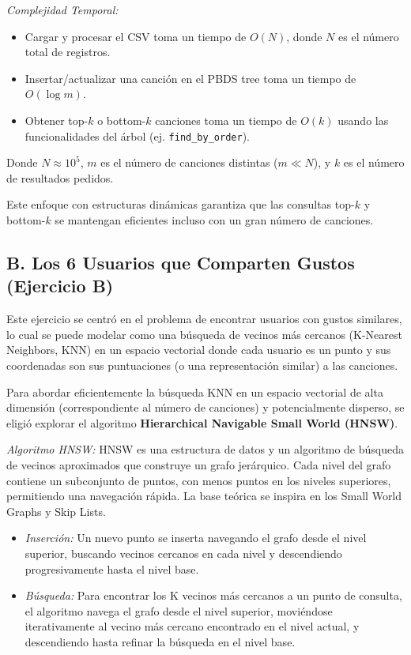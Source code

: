 \documentclass{article}
\begin{document}
\vspace{0.5em}
\noindent \textit{Complejidad Temporal:}
\begin{itemize}[label=\textbullet]
    \item Cargar y procesar el CSV toma un tiempo de \(O(N)\), donde \(N\) es el número total de registros.
    \item Insertar/actualizar una canción en el PBDS tree toma un tiempo de \(O(\log m)\).
    \item Obtener top-\(k\) o bottom-\(k\) canciones toma un tiempo de \(O(k)\) usando las funcionalidades del árbol (ej. \texttt{find\_by\_order}).
\end{itemize}
Donde \(N \approx 10^5\), \(m\) es el número de canciones distintas (\(m \ll N\)), y \(k\) es el número de resultados pedidos.

Este enfoque con estructuras dinámicas garantiza que las consultas top-\(k\) y bottom-\(k\) se mantengan eficientes incluso con un gran número de canciones.

\subsection{B. Los 6 Usuarios que Comparten Gustos (Ejercicio B)}

Este ejercicio se centró en el problema de encontrar usuarios con gustos similares, lo cual se puede modelar como una búsqueda de vecinos más cercanos (K-Nearest Neighbors, KNN) en un espacio vectorial donde cada usuario es un punto y sus coordenadas son sus puntuaciones (o una representación similar) a las canciones.

Para abordar eficientemente la búsqueda KNN en un espacio vectorial de alta dimensión (correspondiente al número de canciones) y potencialmente disperso, se eligió explorar el algoritmo \textbf{Hierarchical Navigable Small World (HNSW)}.

\vspace{0.5em}
\noindent \textit{Algoritmo HNSW:} HNSW es una estructura de datos y un algoritmo de búsqueda de vecinos aproximados que construye un grafo jerárquico. Cada nivel del grafo contiene un subconjunto de puntos, con menos puntos en los niveles superiores, permitiendo una navegación rápida. La base teórica se inspira en los Small World Graphs y Skip Lists.
\begin{itemize}[label=\textbullet]
    \item \textit{Inserción:} Un nuevo punto se inserta navegando el grafo desde el nivel superior, buscando vecinos cercanos en cada nivel y descendiendo progresivamente hasta el nivel base.
    \item \textit{Búsqueda:} Para encontrar los K vecinos más cercanos a un punto de consulta, el algoritmo navega el grafo desde el nivel superior, moviéndose iterativamente al vecino más cercano encontrado en el nivel actual, y descendiendo hasta refinar la búsqueda en el nivel base.
\end{itemize}
\end{document}
